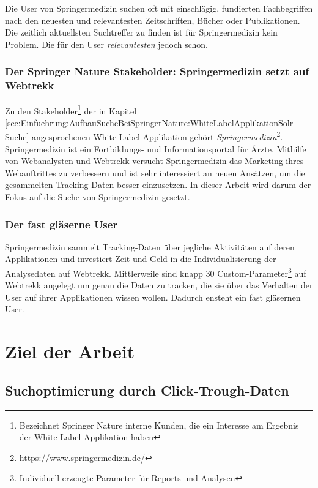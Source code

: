 Die User von Springermedizin suchen oft mit einschlägig, fundierten Fachbegriffen nach den neuesten und relevantesten Zeitschriften, Bücher oder Publikationen. Die zeitlich aktuellsten Suchtreffer zu finden ist für Springermedizin kein Problem. Die für den User \textit{relevantesten} jedoch schon.

\subsubsection{Der Springer Nature Stakeholder: Springermedizin setzt auf Webtrekk}
\label{sec:Einfuehrung:Problemstellung:Springermedizin}

Zu den Stakeholder\footnote{Bezeichnet Springer Nature interne Kunden, die ein Interesse am Ergebnis der White Label Applikation haben} der in Kapitel \ref{sec:Einfuehrung:AufbauSucheBeiSpringerNature:WhiteLabelApplikationSolr-Suche} angesprochenen White Label Applikation gehört \textit{Springermedizin}\footnote{https://www.springermedizin.de/}. Springermedizin ist ein Fortbildungs- und Informationsportal für Ärzte. Mithilfe von Webanalysten und Webtrekk versucht Springermedizin das Marketing ihres Webauftrittes zu verbessern und ist sehr interessiert an neuen Ansätzen, um die gesammelten Tracking-Daten besser einzusetzen. In dieser Arbeit wird darum der Fokus auf die Suche von Springermedizin gesetzt. 
 

\subsubsection{Der fast gläserne User}
\label{sec:Einfuehrung:Problemstellung:Glaeserne-User}

Springermedizin sammelt Tracking-Daten über jegliche Aktivitäten auf deren Applikationen und investiert Zeit und Geld in die Individualisierung der Analysedaten auf Webtrekk. Mittlerweile sind knapp 30 Custom-Parameter\footnote{Individuell erzeugte Parameter für Reports und Analysen} auf Webtrekk angelegt um genau die Daten zu tracken, die sie über das Verhalten der User auf ihrer Applikationen wissen wollen. Dadurch ensteht ein fast \glqq gläsernen User\grqq{}.

\section{Ziel der Arbeit}
\label{sec:Einfuehrung:ZielArbeit}

\subsection{Suchoptimierung durch Click-Trough-Daten}
\label{sec:Einfuehrung:ZielArbeit:Suchoptimierung}

